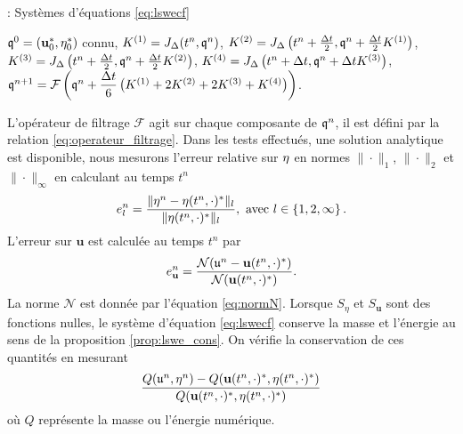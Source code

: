 \begin{center}
\begin{minipage}[H]{12cm}
  \begin{algorithm}[H]
    \caption{: Systèmes d'équations \eqref{eq:lswecf} }\label{alg:RK4_lswecf}
    \begin{algorithmic}[1]
    \State $\mathfrak{q}^0 = (\mathbf{u}_0^* , \eta_0^*)$ connu,
             \State  $K^{(1)} = J_{\Delta}(t^n, \mathfrak{q}^n)$,
             \State  $K^{(2)} = J_{\Delta}\left(t^n + \frac{\Delta t}{2}, \mathfrak{q}^n + \frac{\Delta t}{2} K^{(1)} \right)$,
             \State  $K^{(3)} = J_{\Delta}\left(t^n + \frac{\Delta t}{2}, \mathfrak{q}^n + \frac{\Delta t}{2} K^{(2)} \right)$,
             \State  $K^{(4)} = J_{\Delta}\left(t^n + \Delta t,  \mathfrak{q}^n + \Delta t K^{(3)} \right)$,  
             \State  $\mathfrak{q}^{n+1} = \mathcal{F}\left( \mathfrak{q}^n  + \dfrac{\Delta t}{6} \left( K^{(1)} + 2 K^{(2)} + 2 K^{(3)} + K^{(4)} \right) \right)$.
            \EndFor
    \end{algorithmic}
    \end{algorithm}
\end{minipage}
\end{center} 

L'opérateur de filtrage $\mathcal{F}$ agit sur chaque composante de $\mathfrak{q}^n$, il est défini par la relation \eqref{eq:operateur_filtrage}. Dans les tests effectués, une solution analytique est disponible, nous mesurons l'erreur relative sur $\mathbf{\eta}$ en normes $\| \cdot \|_1$, $\| \cdot \|_2$ et $\| \cdot \|_{\infty}$ en calculant au temps $t^n$
\begin{equation}
e_{l}^n = \dfrac{\| \mathbf{\eta}^n - \eta(t^n, \cdot)^* \|_{l}}{\| \eta(t^n, \cdot)^* \|_{l}}, \text{ avec } l \in \left\lbrace 1, 2, \infty \right\rbrace.
\end{equation}
L'erreur sur $\mathbf{u}$  est calculée au temps $t^n$ par
\begin{equation}
e_{\mathbf{u}}^n = \dfrac{\mathcal{N}(\mathfrak{u}^n - \mathbf{u}(t^n , \cdot)^*)}{\mathcal{N}(\mathbf{u}(t^n , \cdot)^*)}.
\end{equation}
La norme $\mathcal{N}$ est donnée par l'équation \eqref{eq:normN}. Lorsque $S_{\eta}$ et $S_{\mathbf{u}}$ sont des fonctions nulles, le système d'équation \eqref{eq:lswecf} conserve la masse et l'énergie au sens de la proposition \ref{prop:lswe_cons}. On vérifie la conservation de ces quantités en mesurant 
\begin{equation}
\dfrac{Q(\mathfrak{u}^n, \mathbf{\eta}^n)-Q(\mathbf{u}(t^n, \cdot)^*, \eta(t^n, \cdot)^*)}{Q(\mathbf{u}(t^n,\cdot)^*, \eta(t^n, \cdot)^*)}
\end{equation}
où $Q$ représente la masse ou l'énergie numérique.

